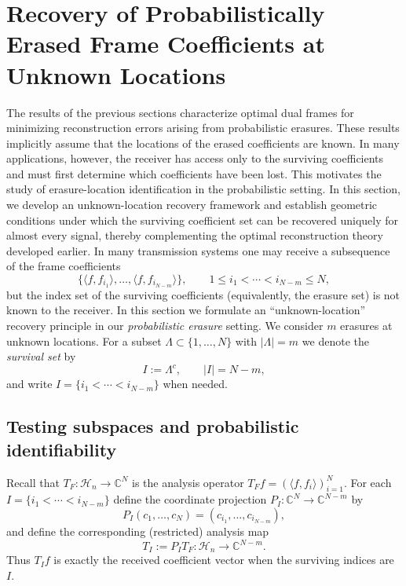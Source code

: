 \documentclass[final,1p,times]{elsarticle}
\begin{document}
\section{Recovery of Probabilistically Erased Frame Coefficients at Unknown Locations}
\label{sec:unknown_locations_prob}
\noindent The results of the previous sections characterize optimal dual frames for minimizing reconstruction errors arising from probabilistic erasures. These results implicitly assume that the locations of the erased coefficients are known. In many applications, however, the receiver has access only to the surviving coefficients and must first determine which coefficients have been lost. This motivates the study of erasure-location identification in the probabilistic setting. In this section, we develop an unknown-location recovery framework and establish geometric conditions under which the surviving coefficient set can be recovered uniquely for almost every signal, thereby complementing the optimal reconstruction theory developed earlier. In many transmission systems one may receive a subsequence of the frame coefficients
\[
\big\{\langle f,f_{i_1}\rangle,\ldots,\langle f,f_{i_{N-m}}\rangle\big\},
\qquad 1\le i_1<\cdots<i_{N-m}\le N,
\]
but the index set of the surviving coefficients (equivalently, the erasure set) is not known to the receiver.
In this section we formulate an ``unknown-location'' recovery principle in our \emph{probabilistic erasure} setting. We consider $m$ erasures at unknown locations.
For a subset $\Lambda\subset\{1,\dots,N\}$ with $|\Lambda|=m$ we denote the \emph{survival set} by
\[
I:=\Lambda^c,\qquad |I|=N-m,
\]
and write $I=\{i_1<\cdots<i_{N-m}\}$ when needed.

\subsection{Testing subspaces and probabilistic identifiability}

Recall that $T_F:\mathcal H_n\to\mathbb C^N$ is the analysis operator $T_F f=(\langle f,f_i\rangle)_{i=1}^N$.
For each $I=\{i_1<\cdots<i_{N-m}\}$ define the coordinate projection
$P_I:\mathbb C^N\to\mathbb C^{N-m}$ by
\[
P_I(c_1,\dots,c_N)=(c_{i_1},\dots,c_{i_{N-m}}),
\]
and define the corresponding (restricted) analysis map
\[
T_I := P_IT_F:\mathcal H_n\longrightarrow \mathbb C^{N-m}.
\]
Thus $T_I f$ is exactly the received coefficient vector when the surviving indices are $I$.
\end{document}
